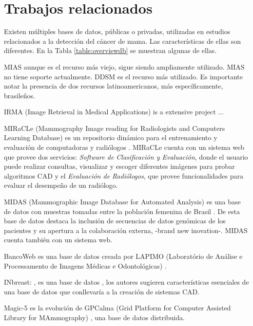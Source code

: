 \section{Trabajos relacionados}

Existen múltiples bases de datos, públicas o privadas, utilizadas en estudios
relacionados a la detección del cáncer de mama. Las características de ellas
son diferentes. En la Tabla \ref{table:overviewdb} se muestran algunas de ellas.

MIAS \cite{sucklingmini} aunque es el recurso más viejo, sigue siendo
ampliamente utilizado. MIAS no tiene soporte actualmente. DDSM
\cite{heath2000digital} es el recurso más utilizado. Es importante notar la
presencia de dos recursos latinoamericanos, más específicamente, brasileños.

IRMA (Image Retrieval in Medical Applications) is a extensive project
\cite{doi:10.1117/12.770325} ...

MIRaCLe (Mammography Image reading for Radiologists and Computers Learning
Database) es un repositorio dinámico para el entrenamiento y evaluación de
computadoras y radiólogos \cite{antoniou2009web}. MIRaCLe cuenta con un sistema
web que provee dos servicios: \textit{Software de Clasificación y Evaluación},
donde el usuario puede realizar consultas, visualizar y escoger diferentes
imágenes para probar algoritmos CAD y el \textit{Evaluación de Radiólogos}, que
provee funcionalidades para evaluar el desempeño de un radiólogo.

MIDAS (Mammographic Image Database for Automated Analysis) es una base de datos
con muestras tomadas entre la población femenina de Brasil
\cite{fernandes2012midas}. De esta base de datos destaca la inclusión de
secuencias de datos genómicas de los pacientes y su apertura a la colaboración
externa, -brand new inovation-. MIDAS cuenta también con un sistema web.

BancoWeb es una base de datos creada por LAPIMO (Laboratório de Análise e
Processamento de Imagens Médicas e Odontológicas) \cite{matheus2011online}.

INbreast: \cite{moreira2012inbreast}, es una base de datos , los autores
sugieren características esenciales de una base de datos que conllevaría a la
creación de sistemas CAD.

Magic-5 \cite{bellotti2004magic} es la evolución de GPCalma (Grid Platform for
Computer Assisted Library for MAmmography) \cite{lauria2006gpcalma}, una base
de datos distribuida. 

